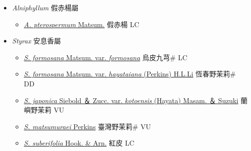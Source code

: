 
  \begin{itemize}
 \item[] \textit{Alniphyllum} 假赤楊屬
                    
  \begin{itemize}
        \item[] \href{http://www.theplantlist.org/tpl1.1/search?q=Alniphyllum+pterospermum}{\textit{A. pterospermum} Matsum.}   假赤楊 LC
  \end{itemize}
 \item[] \textit{Styrax} 安息香屬
                    
  \begin{itemize}
        \item[] \href{http://www.theplantlist.org/tpl1.1/search?q=Styrax+formosana+var.+formosana}{\textit{S. formosana} Matsum. var. \textit{formosana}}   烏皮九芎\# LC
        \item[] \href{http://www.theplantlist.org/tpl1.1/search?q=Styrax+formosana+var.+hayataiana}{\textit{S. formosana} Matsum. var. \textit{hayataiana} (Perkins) H.L.Li}   恆春野茉莉\# DD
        \item[] \href{http://www.theplantlist.org/tpl1.1/search?q=Styrax+japonica+var.+kotoensis}{\textit{S. japonica} Siebold ＆ Zucc. var. \textit{kotoensis} (Hayata) Masam. ＆ Suzuki}   蘭嶼野茉莉 VU
        \item[] \href{http://www.theplantlist.org/tpl1.1/search?q=Styrax+matsumuraei}{\textit{S. matsumuraei} Perkins}   臺灣野茉莉\# VU
        \item[] \href{http://www.theplantlist.org/tpl1.1/search?q=Styrax+suberifolia}{\textit{S. suberifolia} Hook. \& Arn.}   紅皮 LC
  \end{itemize}
  \end{itemize}
